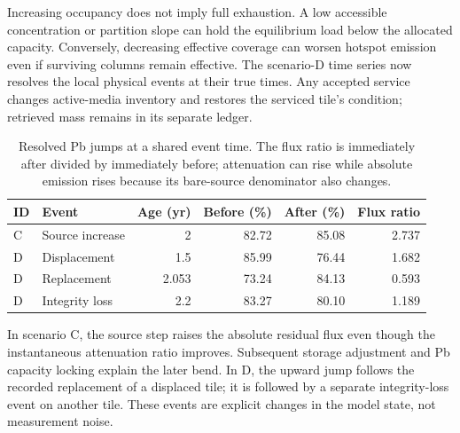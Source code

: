 Increasing occupancy does not imply full exhaustion. A low accessible concentration or partition slope can hold the equilibrium load below the allocated capacity. Conversely, decreasing effective coverage can worsen hotspot emission even if surviving columns remain effective. The scenario-D time series now resolves the local physical events at their true times. Any accepted service changes active-media inventory and restores the serviced tile's condition; retrieved mass remains in its separate ledger.

\begin{table}[htbp]\centering\small
\caption{Resolved Pb jumps at a shared event time. The flux ratio is immediately after divided by immediately before; attenuation can rise while absolute emission rises because its bare-source denominator also changes.}\label{tab:event-jumps}
\begin{tabular}{llrrrr}\toprule
ID & Event & Age (yr) & Before (\%) & After (\%) & Flux ratio \\
\midrule
C & Source increase & 2 & 82.72 & 85.08 & 2.737 \\
D & Displacement & 1.5 & 85.99 & 76.44 & 1.682 \\
D & Replacement & 2.053 & 73.24 & 84.13 & 0.593 \\
D & Integrity loss & 2.2 & 83.27 & 80.10 & 1.189 \\
\bottomrule\end{tabular}\end{table}

In scenario C, the source step raises the absolute residual flux even though the instantaneous attenuation ratio improves. Subsequent storage adjustment and Pb capacity locking explain the later bend. In D, the upward jump follows the recorded replacement of a displaced tile; it is followed by a separate integrity-loss event on another tile. These events are explicit changes in the model state, not measurement noise.

